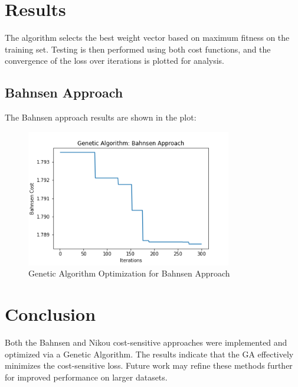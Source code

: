 \documentclass[11pt]{article}
\begin{document}
\section{Results}
The algorithm selects the best weight vector based on maximum fitness on the training set. Testing is then performed using both cost functions, and the convergence of the loss over iterations is plotted for analysis.

\subsection{Bahnsen Approach}
The Bahnsen approach results are shown in the plot:
\begin{figure}[h]
    \centering
    \includegraphics[width=0.8\textwidth]{bahnsen_plot.png}
    \caption{Genetic Algorithm Optimization for Bahnsen Approach}
\end{figure}

\section{Conclusion}
Both the Bahnsen and Nikou cost-sensitive approaches were implemented and optimized via a Genetic Algorithm. The results indicate that the GA effectively minimizes the cost-sensitive loss. Future work may refine these methods further for improved performance on larger datasets.
\end{document}
